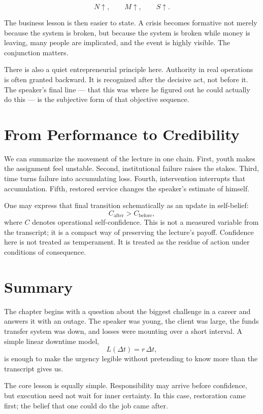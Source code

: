 \begin{equation}
N \uparrow, \qquad M \uparrow, \qquad S \uparrow.
\end{equation}

The business lesson is then easier to state. A crisis becomes formative not merely because the system is broken, but because the system is broken while money is leaving, many people are implicated, and the event is highly visible. The conjunction matters.

There is also a quiet entrepreneurial principle here. Authority in real operations is often granted backward. It is recognized after the decisive act, not before it. The speaker's final line --- that this was where he figured out he could actually do this --- is the subjective form of that objective sequence.

\section{From Performance to Credibility}

We can summarize the movement of the lecture in one chain. First, youth makes the assignment feel unstable. Second, institutional failure raises the stakes. Third, time turns failure into accumulating loss. Fourth, intervention interrupts that accumulation. Fifth, restored service changes the speaker's estimate of himself.

One may express that final transition schematically as an update in self-belief:
\begin{equation}
C_{\text{after}} > C_{\text{before}},
\end{equation}
where \(C\) denotes operational self-confidence. This is not a measured variable from the transcript; it is a compact way of preserving the lecture's payoff. Confidence here is not treated as temperament. It is treated as the residue of action under conditions of consequence.

\section{Summary}

The chapter begins with a question about the biggest challenge in a career and answers it with an outage. The speaker was young, the client was large, the funds transfer system was down, and losses were mounting over a short interval. A simple linear downtime model,
\[
L(\Delta t)=r\,\Delta t,
\]
is enough to make the urgency legible without pretending to know more than the transcript gives us.

The core lesson is equally simple. Responsibility may arrive before confidence, but execution need not wait for inner certainty. In this case, restoration came first; the belief that one could do the job came after.